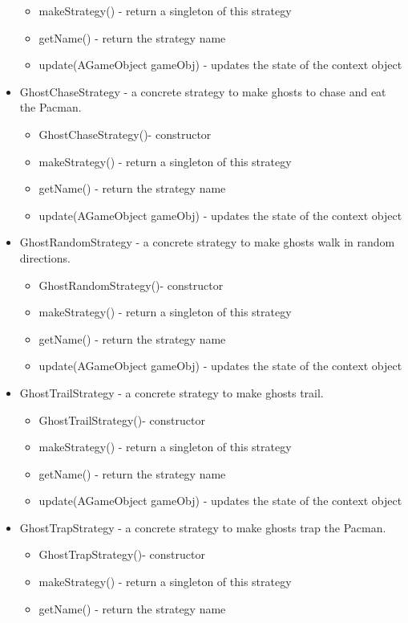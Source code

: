 \documentclass[letterpaper, 11pt]{article}
\begin{document}
\begin{itemize}
\begin{itemize}
  \item makeStrategy() - return a singleton of this strategy
  \item getName() - return the strategy name
  \item update(AGameObject gameObj) - updates the state of the context object
  \end{itemize}
  \item GhostChaseStrategy - a concrete strategy to make ghosts to chase and eat the Pacman.
  \begin{itemize}
  \item GhostChaseStrategy()- constructor
  \item makeStrategy() - return a singleton of this strategy
  \item getName() - return the strategy name
  \item update(AGameObject gameObj) - updates the state of the context object
  \end{itemize}
  \item GhostRandomStrategy - a concrete strategy to make ghosts walk in random directions.
  \begin{itemize}
  \item GhostRandomStrategy()- constructor
  \item makeStrategy() - return a singleton of this strategy
  \item getName() - return the strategy name
  \item update(AGameObject gameObj) - updates the state of the context object
  \end{itemize}
   \item GhostTrailStrategy - a concrete strategy to make ghosts trail.
  \begin{itemize}
  \item GhostTrailStrategy()- constructor
  \item makeStrategy() - return a singleton of this strategy
  \item getName() - return the strategy name
  \item update(AGameObject gameObj) - updates the state of the context object
  \end{itemize}
  \item GhostTrapStrategy - a concrete strategy to make ghosts trap the Pacman.
  \begin{itemize}
  \item GhostTrapStrategy()- constructor
  \item makeStrategy() - return a singleton of this strategy
  \item getName() - return the strategy name

\end{itemize}
\end{itemize}
\end{document}
